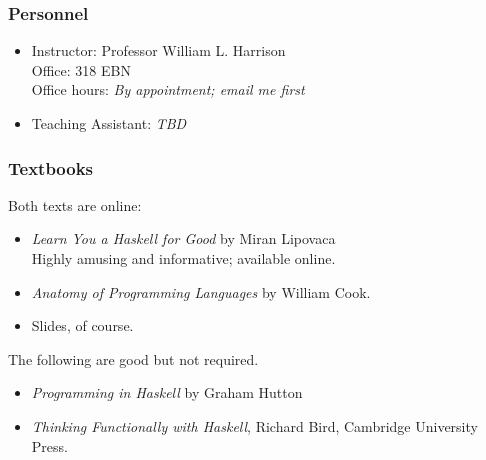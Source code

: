 \documentclass{beamer}
\begin{document}
\frame
{
    \frametitle{Personnel}
    
\begin{itemize}
\item Instructor: Professor William L. Harrison\\
Office: 318 EBN\\
Office hours: \emph{By appointment; email me first}\\



\item Teaching Assistant: \emph{TBD}
\end{itemize}
}

\begin{frame}%
    \frametitle{Textbooks}
    
Both texts are online:    
\begin{itemize}
\item \emph{Learn You a Haskell for Good} by Miran Lipovaca\\
Highly amusing and informative; available online.

\item \emph{Anatomy of Programming Languages} by William Cook.


\item Slides, of course.

\end{itemize}

The following are good but not required.    
\begin{itemize}
\item  \emph{Programming in Haskell} by Graham Hutton\\

\item \emph{Thinking Functionally with Haskell}, Richard Bird, Cambridge University Press.

\end{itemize}

\end{frame}
\end{document}

